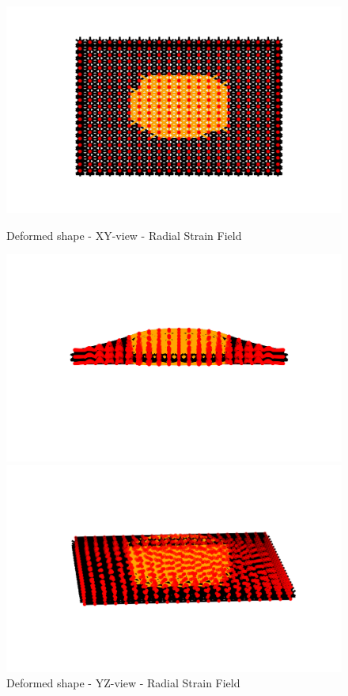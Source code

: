 \begin{figure}[!htbp]
\begin{minipage}{0.3\textwidth}
    \centering
    \includegraphics[width = 1\textwidth]{Figures/circ_XY.png}
    \caption{Deformed shape - XY-view - Radial Strain Field}
    \label{fig:radial_strain_xy}
\end{minipage}
\hspace{5mm}
\begin{minipage}{0.3\textwidth}
    \centering
    \includegraphics[width = 1\textwidth]{Figures/circ_YZ.png}
    \caption{Deformed shape - YZ-view - Radial Strain Field}
    \label{fig:radial_strain_yz}
\end{minipage}
\hspace{5mm}
\begin{minipage}{0.3\textwidth}
    \centering
    \includegraphics[width = 1\textwidth]{Figures/circ_3D.png}

\end{minipage}
\end{figure}
